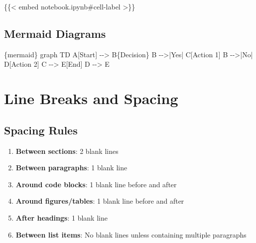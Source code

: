 \documentclass[
  11pt,
  letterpaper,
]{book}
\newenvironment{Shaded}{\begin{snugshade}}{\end{snugshade}}
\newcommand{\DecValTok}[1]{\textcolor[rgb]{0.68,0.00,0.00}{#1}}
\newcommand{\InformationTok}[1]{\textcolor[rgb]{0.37,0.37,0.37}{#1}}
\newcommand{\NormalTok}[1]{\textcolor[rgb]{0.00,0.23,0.31}{#1}}
\providecommand{\tightlist}{%
  \setlength{\itemsep}{0pt}\setlength{\parskip}{0pt}}
\begin{document}
\begin{Shaded}
\begin{Highlighting}[]
\NormalTok{\{\{\textless{} embed notebook.ipynb\#cell{-}label \textgreater{}\}\}}
\end{Highlighting}
\end{Shaded}

\subsection*{Mermaid Diagrams}\label{mermaid-diagrams}

\begin{Shaded}
\begin{Highlighting}[]
\InformationTok{\textasciigrave{}\textasciigrave{}\textasciigrave{}\{mermaid\}}
\NormalTok{graph TD}
\NormalTok{    A[Start] {-}{-}\textgreater{} B\{Decision\}}
\NormalTok{    B {-}{-}\textgreater{}|Yes| C[Action }\DecValTok{1}\NormalTok{]}
\NormalTok{    B {-}{-}\textgreater{}|No| D[Action }\DecValTok{2}\NormalTok{]}
\NormalTok{    C {-}{-}\textgreater{} E[End]}
\NormalTok{    D {-}{-}\textgreater{} E}
\end{Highlighting}
\end{Shaded}

\section*{Line Breaks and Spacing}\label{line-breaks-and-spacing}


\subsection*{Spacing Rules}\label{spacing-rules}

\begin{enumerate}
\def\labelenumi{\arabic{enumi}.}
\tightlist
\item
  \textbf{Between sections}: 2 blank lines
\item
  \textbf{Between paragraphs}: 1 blank line
\item
  \textbf{Around code blocks}: 1 blank line before and after
\item
  \textbf{Around figures/tables}: 1 blank line before and after
\item
  \textbf{After headings}: 1 blank line
\item
  \textbf{Between list items}: No blank lines unless containing multiple
  paragraphs
\end{enumerate}
\end{document}
